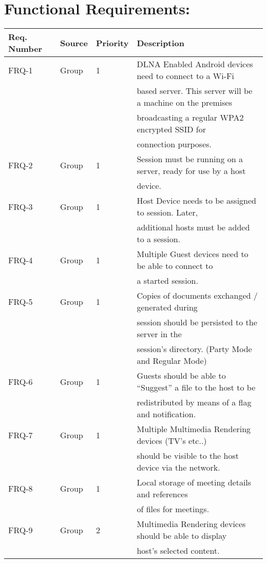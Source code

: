 \documentclass[12pt]{article}
\begin{document}
\section{Functional Requirements:}
\begin{center} \begin{tabular}[h]{|l|l|l|l|}
\hline
Req. Number & Source & Priority & Description \\
\hline
FRQ-1 & Group & 1 & DLNA Enabled Android devices need to connect to a Wi-Fi\\ & & &
					based server.  This server will be a machine on the premises\\ & & &
					broadcasting a regular WPA2 encrypted SSID for\\ & & & 
					 connection purposes.\\
\hline
FRQ-2 & Group & 1 & Session must be running on a server, ready for use by a host\\ & & & 
					device.\\
\hline
FRQ-3 & Group & 1 & Host Device needs to be assigned to session. Later, \\ & & & 
					additional hosts must be added to a session.\\
\hline
FRQ-4 & Group & 1 & Multiple Guest devices need to be able to connect to\\ & & & 
					a started session.\\
\hline
FRQ-5 & Group & 1 & Copies of documents exchanged / generated during \\ & & & 
					session should be persisted to the server in the \\ & & & 
					session's directory. (Party Mode and Regular Mode)\\
\hline
FRQ-6 & Group & 1 & Guests should be able to “Suggest” a file to the host to be\\ & & & 
					 redistributed by means of a flag and notification.\\
\hline
FRQ-7 & Group & 1 & Multiple Multimedia Rendering devices (TV's etc..) \\ & & & 
					should be visible to the host device via the network.\\
\hline
FRQ-8 & Group & 1 & Local storage of meeting details and references\\ & & & 
					 of files for meetings.\\
\hline
FRQ-9 & Group & 2 & Multimedia Rendering devices should be able to display \\ & & & 
					host's selected content.\\

\end{tabular}
\end{center}
\end{document}
